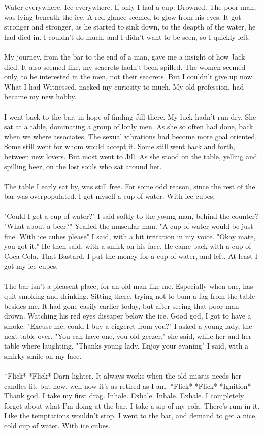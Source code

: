 \documentclass[]{article}
\begin{document}
	Water everywhere. Ice everywhere. If only I had a cup. Drowned. The poor man, was lying beneath the ice. A red glance seemed to glow from his eyes. It got stronger and stronger, as he started to sink down, to the deapth of the water, he had died in. I couldn't do much, and I didn't want to be seen, so I quickly left.
	\\ \\
	My journey, from the bar to the end of a man, gave me a insight of how Jack died. It also seemed like, my seacrets hadn't been spilled. The women seemed only, to be interested in the men, not their seacrets. But I couldn't give up now. What I had Witnessed, nacked my curiosity to much. My old profession, had became my new hobby. 
	\\ \\
	I went back to the bar, in hope of finding Jill there. My luck hadn't run dry. She sat at a table, dominating a group of lonly men. As she so often had done, back when we where associates. The sexual vibrations had become more goal oriented. Some still went for whom would accept it. Some still went back and forth, between new lovers. But most went to Jill. As she stood on the table, yelling and spilling beer, on the lost souls who sat around her.
	\\ \\
	The table I early sat by, was still free. For some odd reason, since the rest of the bar was overpopulated. I got myself a cup of water. With ice cubes.
	\\ \\
	"Could I get a cup of water?" I said softly to the young man, behind the counter?
	"What about a beer?" Yealled the muscular man.
	"A cup of water would be just fine. With ice cubes please" I said, with a bit irritation in my voice. 
	"Okay mate, you got it." He then said, with a smirk on his face. 
	He came back with a cup of Coca Cola. That Bastard. I put the money for a cup of water, and left. At least I got my ice cubes.
	\\ \\
	The bar isn't a pleasent place, for an old man like me. Especially when one, has quit smoking and drinking. Sitting there, trying not to bum a fag from the table besides me. It had gone easily earlier today, but after seeing that poor man drown. Watching his red eyes dissaper below the ice. Good god, I got to have a smoke. "Excuse me, could I buy a ciggeret from you?" I asked a young lady, the next table over. "You can have one, you old geezer." she said, while her and her table where laughting. "Thanks young lady. Enjoy your evaning" I said, with a smirky smile on my face. 
	\\ \\
	*Flick* *Flick* Darn lighter. It always works when the old missus needs her candles lit, but now, well now it's as retired as I am. *Flick* *Flick* *Ignition* Thank god. I take my first drag. Inhale. Exhale. Inhale. Exhale. I completely forget about what I'm doing at the bar. I take a sip of my cola. There's rum in it. Like the temptations wouldn't stop. I went to the bar, and demand to get a nice, cold cup of water. With ice cubes.
	
\end{document}
